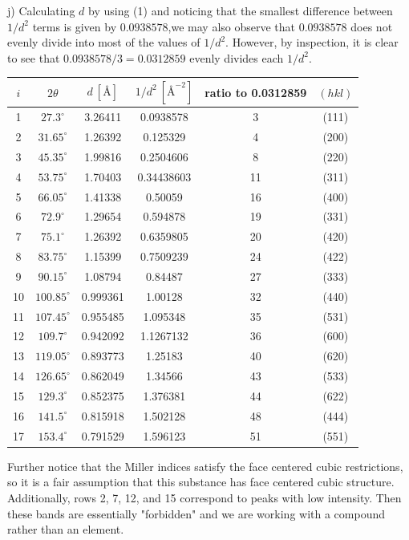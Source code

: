 \documentclass{article}
\begin{document}
j) Calculating $d$ by using (1) and noticing that the smallest difference between $1/d^2$ terms is given by $0.0938578$,we may also observe that $0.0938578$ does not evenly divide into most of the values of $1/d^2$. However, by inspection, it is clear to see that $0.0938578/3 = 0.0312859$ evenly divides each $1/d^2$.
\begin{center}
    \begin{tabular}{c|c|c|c|c|c}
        $i$ & $2\theta$ & $d\: [\text{\AA}]$ & $1/d^2\: [\text{\AA}^{-2}]$  & ratio to 0.0312859 & $(hkl)$\\
        \hline
         1 & $27.3^{\circ}$ & 3.26411 & 0.0938578 & 3 & (111) \\
         2 & $31.65^{\circ}$ & 1.26392 & 0.125329 & 4 & (200) \\
         3 & $45.35^{\circ}$ & 1.99816 & 0.2504606 & 8 & (220) \\
         4 & $53.75^{\circ}$ & 1.70403 & 0.34438603 & 11 & (311) \\
         5 & $66.05^{\circ}$ & 1.41338 & 0.50059 & 16 & (400) \\
         6 & $72.9^{\circ}$ & 1.29654 & 0.594878 & 19 & (331) \\
         7 & $75.1^{\circ}$ & 1.26392 & 0.6359805 & 20 & (420) \\
         8 & $83.75^{\circ}$ & 1.15399 & 0.7509239 & 24 & (422) \\
         9 & $90.15^{\circ}$ & 1.08794 & 0.84487 & 27 & (333) \\
         10 & $100.85^{\circ}$ & 0.999361 & 1.00128 & 32 & (440) \\
         11 & $107.45^{\circ}$ & 0.955485 & 1.095348 & 35 & (531) \\
         12 & $109.7^{\circ}$ & 0.942092 & 1.1267132 & 36 & (600) \\
         13 & $119.05^{\circ}$ & 0.893773 & 1.25183 & 40 & (620) \\
         14 & $126.65^{\circ}$ & 0.862049 & 1.34566 & 43 & (533) \\
         15 & $129.3^{\circ}$ & 0.852375 & 1.376381 & 44 & (622) \\
         16 & $141.5^{\circ}$ & 0.815918 & 1.502128 & 48 & (444) \\
         17 & $153.4^{\circ}$ & 0.791529 & 1.596123 & 51 & (551) \\
    \end{tabular}
\end{center}
Further notice that the Miller indices satisfy the face centered cubic restrictions, so it is a fair assumption that this substance has face centered cubic structure. Additionally, rows 2, 7, 12, and 15 correspond to peaks with low intensity. Then these bands are essentially "forbidden" and we are working with a compound rather than an element.
\newline
\end{document}
